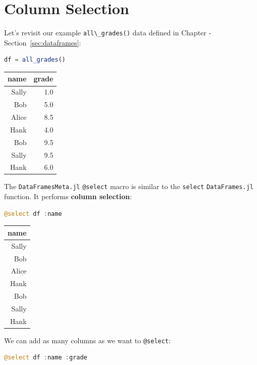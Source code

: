 \documentclass[
  notoc %
]{tufte-book}
\newcommand{\passthrough}[1]{#1}
\begin{document}
\hypertarget{sec:dataframesmeta_select}{%
\section{Column Selection}\label{sec:dataframesmeta_select}}

Let's revisit our example \passthrough{\lstinline!all\_grades()!} data
defined in Chapter -Section~\ref{sec:dataframes}:

\begin{lstlisting}[language=Julia]
df = all_grades()
\end{lstlisting}

\begin{longtable}[]{@{}rr@{}}
\toprule()
name & grade \\
\midrule()
\endhead
Sally & 1.0 \\
Bob & 5.0 \\
Alice & 8.5 \\
Hank & 4.0 \\
Bob & 9.5 \\
Sally & 9.5 \\
Hank & 6.0 \\
\bottomrule()
\end{longtable}

The \passthrough{\lstinline!DataFramesMeta.jl!}
\passthrough{\lstinline!@select!} macro is similar to the
\passthrough{\lstinline!select!} \passthrough{\lstinline!DataFrames.jl!}
function. It performs \textbf{column selection}:

\begin{lstlisting}[language=Julia]
@select df :name
\end{lstlisting}

\begin{longtable}[]{@{}r@{}}
\toprule()
name \\
\midrule()
\endhead
Sally \\
Bob \\
Alice \\
Hank \\
Bob \\
Sally \\
Hank \\
\bottomrule()
\end{longtable}

We can add as many columns as we want to
\passthrough{\lstinline!@select!}:

\begin{lstlisting}[language=Julia]
@select df :name :grade
\end{lstlisting}
\end{document}
